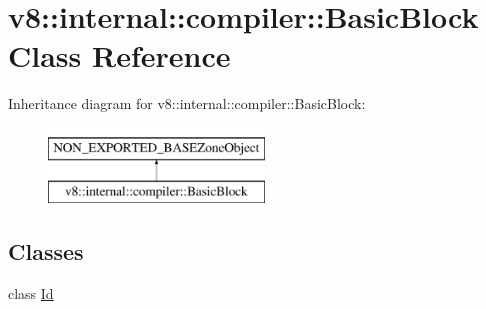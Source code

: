 \hypertarget{classv8_1_1internal_1_1compiler_1_1BasicBlock}{}\section{v8\+:\+:internal\+:\+:compiler\+:\+:Basic\+Block Class Reference}
\label{classv8_1_1internal_1_1compiler_1_1BasicBlock}
Inheritance diagram for v8\+:\+:internal\+:\+:compiler\+:\+:Basic\+Block\+:\begin{figure}[H]
\begin{center}
\leavevmode
\includegraphics[height=2.000000cm]{classv8_1_1internal_1_1compiler_1_1BasicBlock}
\end{center}
\end{figure}
\subsection*{Classes}
\begin{DoxyCompactItemize}
\item 
class \mbox{\hyperlink{classv8_1_1internal_1_1compiler_1_1BasicBlock_1_1Id}{Id}}
\end{DoxyCompactItemize}
